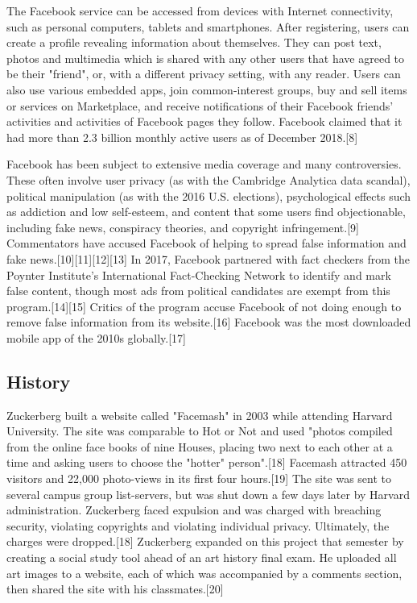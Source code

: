 \documentclass[12pt]{article}
\begin{document}
The Facebook service can be accessed from devices with Internet connectivity, such as personal computers, tablets and smartphones. After registering, users can create a profile revealing information about themselves. They can post text, photos and multimedia which is shared with any other users that have agreed to be their "friend", or, with a different privacy setting, with any reader. Users can also use various embedded apps, join common-interest groups, buy and sell items or services on Marketplace, and receive notifications of their Facebook friends' activities and activities of Facebook pages they follow. Facebook claimed that it had more than 2.3 billion monthly active users as of December 2018.[8]

Facebook has been subject to extensive media coverage and many controversies. These often involve user privacy (as with the Cambridge Analytica data scandal), political manipulation (as with the 2016 U.S. elections), psychological effects such as addiction and low self-esteem, and content that some users find objectionable, including fake news, conspiracy theories, and copyright infringement.[9] Commentators have accused Facebook of helping to spread false information and fake news.[10][11][12][13] In 2017, Facebook partnered with fact checkers from the Poynter Institute's International Fact-Checking Network to identify and mark false content, though most ads from political candidates are exempt from this program.[14][15] Critics of the program accuse Facebook of not doing enough to remove false information from its website.[16] Facebook was the most downloaded mobile app of the 2010s globally.[17] 





\subsection{History}



Zuckerberg built a website called "Facemash" in 2003 while attending Harvard University. The site was comparable to Hot or Not and used "photos compiled from the online face books of nine Houses, placing two next to each other at a time and asking users to choose the "hotter" person".[18] Facemash attracted 450 visitors and 22,000 photo-views in its first four hours.[19] The site was sent to several campus group list-servers, but was shut down a few days later by Harvard administration. Zuckerberg faced expulsion and was charged with breaching security, violating copyrights and violating individual privacy. Ultimately, the charges were dropped.[18] Zuckerberg expanded on this project that semester by creating a social study tool ahead of an art history final exam. He uploaded all art images to a website, each of which was accompanied by a comments section, then shared the site with his classmates.[20]
\end{document}
